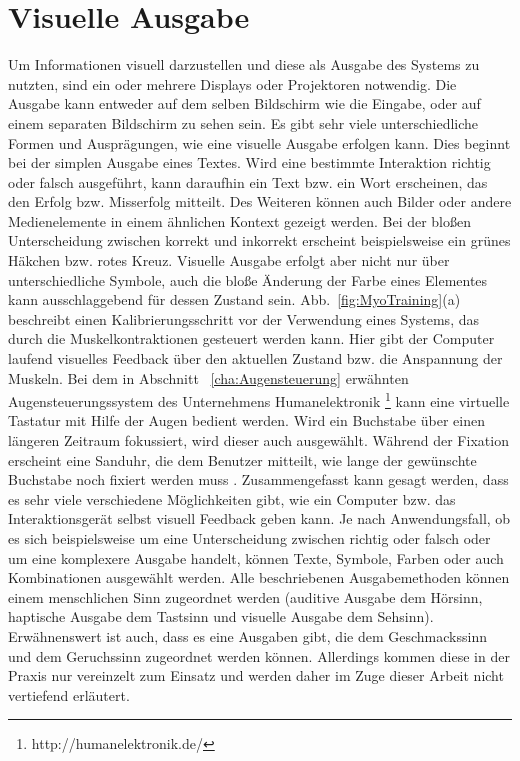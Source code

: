 \section{Visuelle Ausgabe}
Um Informationen visuell darzustellen und diese als Ausgabe des Systems zu nutzten, sind ein oder mehrere Displays oder Projektoren notwendig. Die Ausgabe kann entweder auf dem selben Bildschirm wie die Eingabe, oder auf einem separaten Bildschirm zu sehen sein.
\newline \newline
Es gibt sehr viele unterschiedliche Formen und Ausprägungen, wie eine visuelle Ausgabe erfolgen kann. Dies beginnt bei der simplen Ausgabe eines Textes. Wird eine bestimmte Interaktion richtig oder falsch ausgeführt, kann daraufhin ein Text bzw. ein Wort erscheinen, das den Erfolg bzw. Misserfolg mitteilt. Des Weiteren können auch Bilder oder andere Medienelemente in einem ähnlichen Kontext gezeigt werden. Bei der bloßen Unterscheidung zwischen korrekt und inkorrekt erscheint beispielsweise ein grünes Häkchen bzw. rotes Kreuz. Visuelle Ausgabe erfolgt aber nicht nur über unterschiedliche Symbole, auch die bloße Änderung der Farbe eines Elementes kann ausschlaggebend für dessen Zustand sein.
\newline \newline
Abb.~\ref{fig:MyoTraining}(a) beschreibt einen Kalibrierungsschritt vor der Verwendung eines Systems, das durch die Muskelkontraktionen gesteuert werden kann. Hier gibt der Computer laufend visuelles Feedback über den aktuellen Zustand bzw. die Anspannung der Muskeln.
\newline \newline
Bei dem in Abschnitt ~\ref{cha:Augensteuerung} erwähnten Augensteuerungssystem des Unternehmens Humanelektronik%
\footnote{http://humanelektronik.de/}
%
kann eine virtuelle Tastatur mit Hilfe der Augen bedient werden. Wird ein Buchstabe über einen längeren Zeitraum fokussiert, wird dieser auch ausgewählt. Während der Fixation erscheint eine Sanduhr, die dem Benutzer mitteilt, wie lange der gewünschte Buchstabe noch fixiert werden muss \cite{SEETECH}. 
%
\newline \newline
Zusammengefasst kann gesagt werden, dass es sehr viele verschiedene Möglichkeiten gibt, wie ein Computer bzw. das Interaktionsgerät selbst visuell Feedback geben kann. Je nach Anwendungsfall, ob es sich beispielsweise um eine Unterscheidung zwischen richtig oder falsch oder um eine komplexere Ausgabe handelt, können Texte, Symbole, Farben oder auch Kombinationen ausgewählt werden.
%
%
\newline \newline \newline
Alle beschriebenen Ausgabemethoden können einem menschlichen Sinn zugeordnet werden (auditive Ausgabe dem Hörsinn, haptische Ausgabe dem Tastsinn und visuelle Ausgabe dem Sehsinn). 
Erwähnenswert ist auch, dass es eine Ausgaben gibt, die dem Geschmackssinn und dem Geruchssinn zugeordnet werden können. Allerdings kommen diese in der Praxis nur vereinzelt zum Einsatz und werden daher im Zuge dieser Arbeit nicht vertiefend erläutert.


